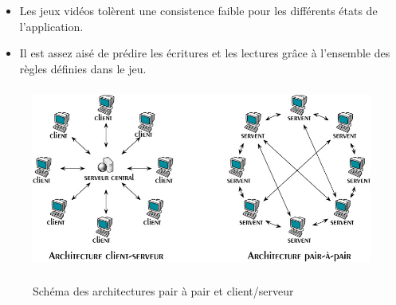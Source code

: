 	\begin{itemize}
		\renewcommand{\labelitemi}{$\bullet$}
		\item Les jeux vidéos tolèrent une consistence faible pour les différents états de l'application.
		\item Il est assez aisé de prédire les écritures et les lectures grâce à l'ensemble des règles définies dans le jeu. 
	\end{itemize}
	\vspace{1cm}
	\begin{figure}[!h]
	\centering
	\includegraphics[width=12cm,height=6cm]{../Images/p2p-85145.png}\\
	\caption{Schéma des architectures pair à pair et client/serveur}
	\label{P2P/ClServ}
	\end{figure} 
\newpage

